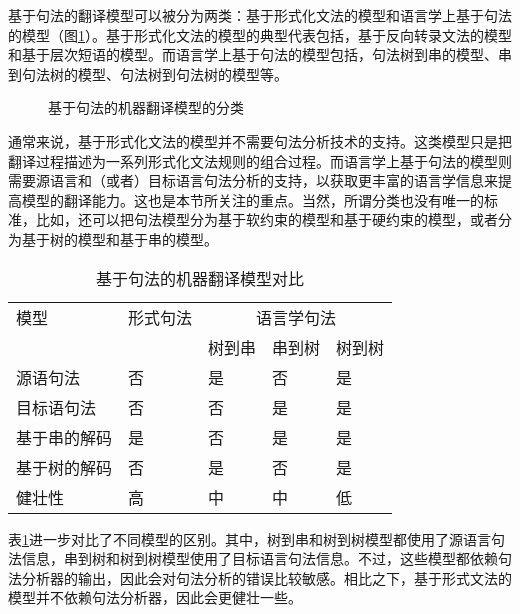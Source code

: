 \parinterval 基于句法的翻译模型可以被分为两类：基于形式化文法的模型和语言学上基于句法的模型（图\ref{fig:8-17}）。基于形式化文法的模型的典型代表包括，基于反向转录文法的模型和基于层次短语的模型。而语言学上基于句法的模型包括，句法树到串的模型、串到句法树的模型、句法树到句法树的模型等。

\begin{figure}[htp]
\centering

\caption{基于句法的机器翻译模型的分类}
\label{fig:8-17}
\end{figure}

\parinterval 通常来说，基于形式化文法的模型并不需要句法分析技术的支持。这类模型只是把翻译过程描述为一系列形式化文法规则的组合过程。而语言学上基于句法的模型则需要源语言和（或者）目标语言句法分析的支持，以获取更丰富的语言学信息来提高模型的翻译能力。这也是本节所关注的重点。当然，所谓分类也没有唯一的标准，比如，还可以把句法模型分为基于软约束的模型和基于硬约束的模型，或者分为基于树的模型和基于串的模型。

\begin{table}[htp]{
\begin{center}
\caption{基于句法的机器翻译模型对比}
\label{tab:8-3}
{
\begin{tabular}{l | l | l | l | l}
模型 & 形式句法 & \multicolumn{3}{c}{语言学句法} \\
\cline{3-5}
\rule{0pt}{15pt} & & \multicolumn{1}{c|}{树到串} & \multicolumn{1}{c}{串到树} & \multicolumn{1}{|c}{树到树} \\
\hline
\rule{0pt}{15pt}源语句法 & 否 & 是 & 否 & 是 \\
\rule{0pt}{15pt}目标语句法 & 否 & 否 & 是 & 是 \\
\rule{0pt}{15pt}基于串的解码 & 是 & 否 & 是 & 是 \\
\rule{0pt}{15pt}基于树的解码 & 否 & 是 & 否 & 是 \\
\rule{0pt}{15pt}健壮性 & 高 & 中 & 中 & 低 \\
\end{tabular}
}
\end{center}
}\end{table}

\parinterval 表\ref{tab:8-3}进一步对比了不同模型的区别。其中，树到串和树到树模型都使用了源语言句法信息，串到树和树到树模型使用了目标语言句法信息。不过，这些模型都依赖句法分析器的输出，因此会对句法分析的错误比较敏感。相比之下，基于形式文法的模型并不依赖句法分析器，因此会更健壮一些。

